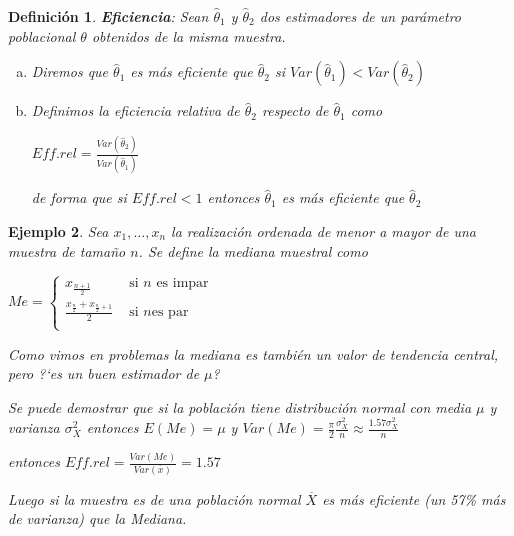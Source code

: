 \documentclass[12pt]{report}
\newtheorem{definition}{Definici\'on}
\newtheorem{example}[definition]{Ejemplo}
\begin{document}
\begin{definition}\textbf{Eficiencia}:
Sean $\hat{\theta}_{1}$ y $\hat{\theta}_{2}$ dos estimadores de un par\'ametro poblacional
$\theta$ obtenidos de la misma muestra.

\begin{enumerate}[a)]
    \item Diremos que $\hat{\theta}_{1}$ es m\'as eficiente que $\hat{\theta}_{2}$
    si $Var(\hat{\theta}_{1})< Var(\hat{\theta}_{2})$
    \item Definimos la eficiencia relativa de $\hat{\theta}_{2}$
    respecto de
    $\hat{\theta}_{1}$ como

    $Eff.rel=\frac{Var(\hat{\theta}_{2})}{Var(\hat{\theta}_{1})}$


    de forma que si $Eff.rel<1$ entonces
    $\hat{\theta}_{1}$ es m\'as eficiente que $\hat{\theta}_{2}$

    \end{enumerate}
\end{definition}
    \begin{example}

    Sea $x_{1},\ldots,x_{n}$ la realizaci\'on ordenada de menor a mayor
     de una muestra de tama\~{n}o $n$. Se define la mediana muestral como

     $Me=\left\{\begin{array}{ll}
     x_{\frac{n+1}{2}} & \mbox{ si  } n  \mbox{  es impar }\\
      \frac{x_{\frac{n}{2}}+ x_{\frac{n}{2}+1}}{2} & \mbox{ si } n  \mbox{
      es par }\\
     \end{array}\right.$

     Como vimos en problemas la mediana es tambi\'en un valor de
     tendencia central, pero ?`es un buen estimador de $\mu$?

     Se puede demostrar que  si la poblaci\'on tiene distribuci\'on normal
     con media $\mu$ y varianza $\sigma_{X}^2$ entonces
     $E(Me)=\mu$ y $Var(Me)=\frac{\pi}{2}
     \frac{\sigma_{X}^2}{n}\approx \frac{1.57 \sigma_{X}^2}{n}$

      entonces
      $Eff. rel=\frac{Var(Me)}{Var(\overline{x})}=1.57$

      Luego si la muestra es de una poblaci\'on normal $\overline{X}$
      es m\'as eficiente  (un 57\% m\'as de varianza) que la Mediana.
      \end{example}
\end{document}

